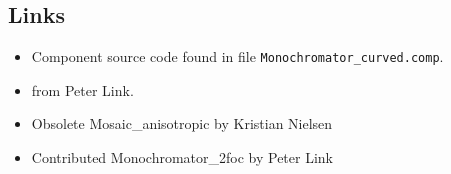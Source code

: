\subsection*{Links}
\begin{itemize}
  \item Component source code found in file \texttt{Monochromator\_curved.comp}.
  \item {} from Peter Link.
  \item Obsolete Mosaic\_anisotropic by Kristian Nielsen
  \item Contributed Monochromator\_2foc by Peter Link
\end{itemize}
